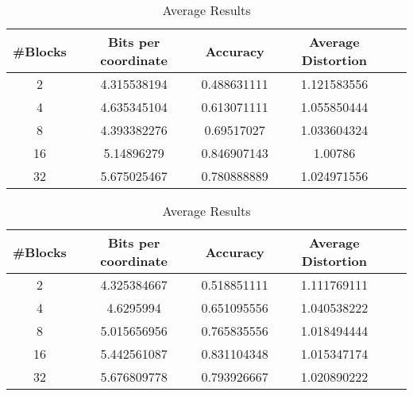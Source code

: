 \begin{table}[h!]
	\centering
	\caption{Average Results \sift{} \qs{}}
	\label{table:avg_sift_qs}
	\begin{tabular}{ccccc}
		\hline
		\#Blocks & Bits per coordinate & Accuracy  & Average Distortion \\ \hline
		2 & 4.315538194	& 0.488631111 & 1.121583556  \\
		4 & 4.635345104 & 0.613071111 & 1.055850444  \\
		8 & 4.393382276 & 0.69517027 & 1.033604324 \\
		16 & 5.14896279 & 0.846907143 & 1.00786 \\
		32 & 5.675025467 & 0.780888889 & 1.024971556 \\
		\hline
	\end{tabular}
\end{table}

\begin{table}[h!]
	\centering
	\caption{Average Results \sift{} \qsr{}}
	\label{table:avg_sift_qsr}
	\begin{tabular}{ccccc}
		\hline
		\#Blocks & Bits per coordinate & Accuracy  & Average Distortion \\ \hline
		2 & 4.325384667	& 0.518851111 & 1.111769111  \\
		4 & 4.6295994 & 0.651095556 & 1.040538222  \\
		8 & 5.015656956 & 0.765835556 & 1.018494444 \\
		16 & 5.442561087 & 0.831104348 & 1.015347174 \\
		32 & 5.676809778 & 0.793926667 & 1.020890222 \\
		\hline
	\end{tabular}
\end{table}